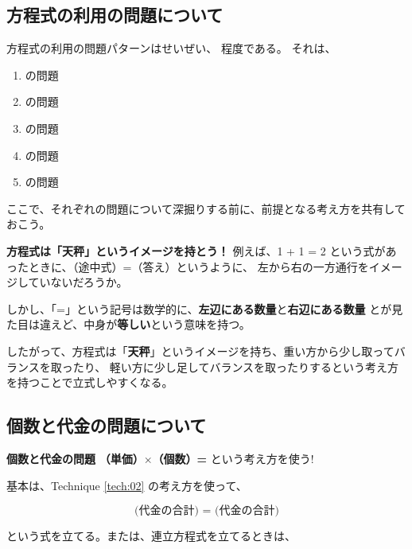 \subsection{方程式の利用の問題について}
方程式の利用の問題パターンはせいぜい、 \fitblankbf[5パターン]{} 程度である。
それは、

\begin{enumerate}
    \item \fitblankbf[個数と代金]{} の問題
    \item \fitblankbf[速さ・時間・距離]{} の問題
    \item \fitblankbf[割合]{} の問題
    \item \fitblankbf[過不足]{} の問題
    \item \fitblankbf[整数・桁数]{} の問題
\end{enumerate}

ここで、それぞれの問題について深掘りする前に、前提となる考え方を共有しておこう。

\begin{techniquebox}[tech:01]{\textbf{方程式は「\textbf{天秤}」というイメージを持とう！}}
    例えば、1 + 1 = 2 という式があったときに、（途中式）=（答え）というように、
    左から右の一方通行をイメージしていないだろうか。

    しかし、「=」という記号は数学的に、\textbf{左辺にある数量}と\textbf{右辺にある数量}
    とが見た目は違えど、中身が\textbf{等しい}という意味を持つ。

    したがって、方程式は「\textbf{天秤}」というイメージを持ち、重い方から少し取ってバランスを取ったり、
    軽い方に少し足してバランスを取ったりするという考え方を持つことで立式しやすくなる。
\end{techniquebox}
\newpage

\subsection{個数と代金の問題について}

\begin{techniquebox}[tech:02]{\textbf{個数と代金の問題}}
    \textbf{（単価）$\times$（個数）= \fitblankbf[代金]{}} という考え方を使う!
\end{techniquebox}

    基本は、Technique \ref{tech:02} の考え方を使って、

    \[\textbf{(代金の合計) = (代金の合計)}\]

    という式を立てる。または、連立方程式を立てるときは、

